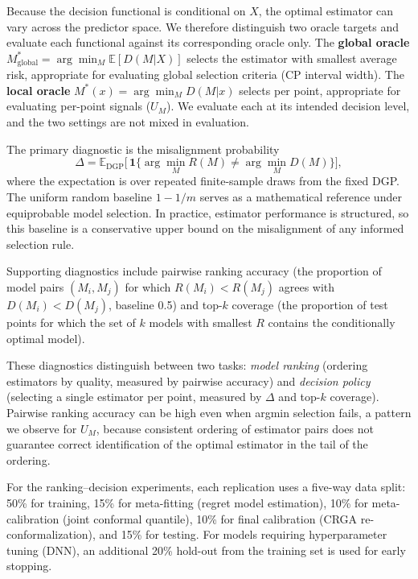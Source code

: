 \documentclass[pdflatex,sn-mathphys-ay]{sn-jnl}%
\theoremstyle{thmstyleone}%
\theoremstyle{thmstyletwo}%
\theoremstyle{thmstylethree}%
\begin{document}
Because the decision functional is conditional on $X$, the optimal estimator can vary across the predictor space. We therefore distinguish two oracle targets and evaluate each functional against its corresponding oracle only. The \textbf{global oracle} $M^\ast_{\text{global}} = \arg\min_M \mathbb{E}[D(M|X)]$ selects the estimator with smallest average risk, appropriate for evaluating global selection criteria (CP interval width). The \textbf{local oracle} $M^\ast(x) = \arg\min_M D(M|x)$ selects per point, appropriate for evaluating per-point signals ($U_M$). We evaluate each at its intended decision level, and the two settings are not mixed in evaluation.

The primary diagnostic is the misalignment probability
\begin{equation}
    \Delta = \mathbb{E}_{\text{DGP}}\bigl[\,\mathbf{1}\{\arg\min_{M} R(M) \neq \arg\min_{M} D(M)\}\bigr],
    \label{eq:delta}
\end{equation}
where the expectation is over repeated finite-sample draws from the fixed DGP. The uniform random baseline $1 - 1/m$ serves as a mathematical reference under equiprobable model selection. In practice, estimator performance is structured, so this baseline is a conservative upper bound on the misalignment of any informed selection rule.

Supporting diagnostics include pairwise ranking accuracy (the proportion of model pairs $(M_i, M_j)$ for which $R(M_i) < R(M_j)$ agrees with $D(M_i) < D(M_j)$, baseline 0.5) and top-$k$ coverage (the proportion of test points for which the set of $k$ models with smallest $R$ contains the conditionally optimal model).

These diagnostics distinguish between two tasks: \textit{model ranking} (ordering estimators by quality, measured by pairwise accuracy) and \textit{decision policy} (selecting a single estimator per point, measured by $\Delta$ and top-$k$ coverage). Pairwise ranking accuracy can be high even when argmin selection fails, a pattern we observe for $U_M$, because consistent ordering of estimator pairs does not guarantee correct identification of the optimal estimator in the tail of the ordering.

For the ranking--decision experiments, each replication uses a five-way data split: 50\% for training, 15\% for meta-fitting (regret model estimation), 10\% for meta-calibration (joint conformal quantile), 10\% for final calibration (CRGA re-conformalization), and 15\% for testing. For models requiring hyperparameter tuning (DNN), an additional 20\% hold-out from the training set is used for early stopping.
\end{document}
